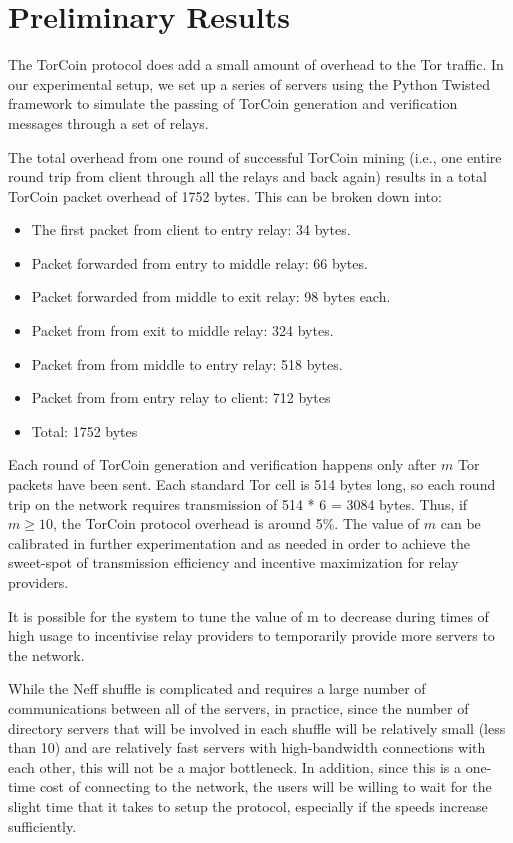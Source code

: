 \section{Preliminary Results}

The TorCoin protocol does add a small amount of overhead to the Tor traffic. In
our experimental setup, we set up a series of servers using the Python Twisted
framework\cite{twisted} to simulate the passing of TorCoin generation and
verification messages through a set of relays.

The total overhead from one round of successful TorCoin mining (i.e., one entire
round trip from client through all the relays and back again) results in a total
TorCoin packet overhead of 1752 bytes. This can be broken down into:

\begin{itemize}
	\item The first packet from client to entry relay: 34 bytes.
	\item Packet forwarded from entry to middle relay: 66 bytes.
	\item Packet forwarded from middle to exit relay: 98 bytes each.
	\item Packet from from exit to middle relay: 324 bytes.
	\item Packet from from middle to entry relay: 518 bytes.
	\item Packet from from entry relay to client: 712 bytes
	\item Total: 1752 bytes
\end{itemize}



Each round of TorCoin generation and verification happens only after $m$ Tor
packets have been sent. Each standard Tor cell is 514 bytes long, so each
round trip on the network requires transmission of 514 * 6 = 3084 bytes. Thus,
if $m \geq 10$, the TorCoin protocol overhead is around 5\%. The value of $m$
can be calibrated in further experimentation and as needed in order to achieve
the sweet-spot of transmission efficiency and incentive maximization for relay
providers.

It is possible for the system to tune the value of m to decrease during times
of high usage to incentivise relay providers to temporarily provide more
servers to the network.

While the Neff shuffle is complicated and requires a large number of
communications between all of the servers, in practice, since the number of
directory servers that will be involved in each shuffle will be relatively
small (less than 10) and are relatively fast servers with high-bandwidth
connections with each other, this will not be a major bottleneck. In addition,
since this is a one-time cost of connecting to the network, the users will be
willing to wait for the slight time that it takes to setup the protocol,
especially if the speeds increase sufficiently.
